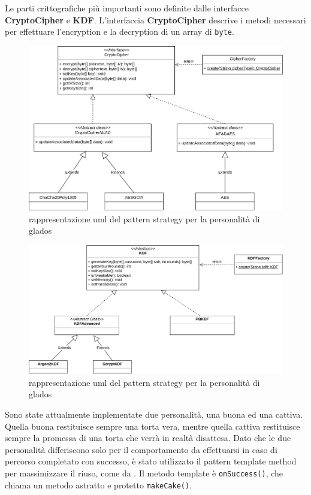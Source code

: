 \documentclass[a4paper,12pt]{report}
\begin{document}
Le parti crittografiche più importanti sono definite dalle interfacce \textbf{CryptoCipher}
e \textbf{KDF}. L'interfaccia \textbf{CryptoCipher} descrive i metodi necessari
per effettuare l'encryption e la decryption di un array di \texttt{byte}.

\begin{figure}[h]
\centering{}
\includegraphics[width=\textwidth]{crypto-cipher}
\caption{rappresentazione uml del pattern strategy per la personalità di glados}
\label{img:strategy}
\end{figure}

\begin{figure}[h]
\centering{}
\includegraphics[width=\textwidth]{kdf}
\caption{rappresentazione uml del pattern strategy per la personalità di glados}
\label{img:strategy}
\end{figure}

Sono state attualmente implementate due personalità, una buona ed una cattiva.
Quella buona restituisce sempre una torta vera, mentre quella cattiva restituisce sempre la 
promessa di una torta che verrà in realtà disattesa.
Dato che le due personalità differiscono solo per il comportamento da effettuarsi in caso di percorso completato con successo, è stato utilizzato il pattern template method per massimizzare il riuso, come da .
Il metodo template è \texttt{onSuccess()}, che chiama un metodo astratto e protetto 
\texttt{makeCake()}.
\end{document}
